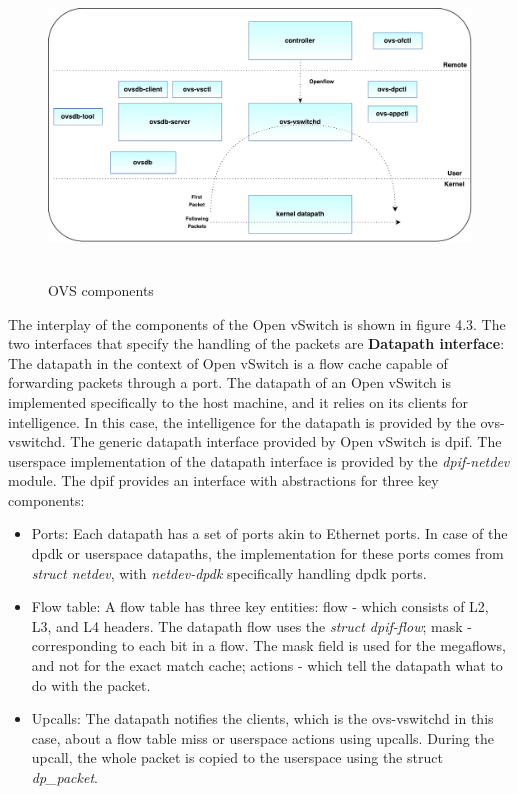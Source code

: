  \begin{figure}[H] 
  \centering   
 \caption{OVS components}
 \includegraphics[height=8cm]{kernaldatapath.pdf}
\end{figure}

The interplay of the components of the Open vSwitch is shown in figure 4.3. The two interfaces that specify the handling of the packets are \newline
\textbf{Datapath interface}: The datapath in the context of Open vSwitch is a flow cache capable of forwarding packets through a port. The datapath of an Open vSwitch is implemented specifically to the host machine, and it relies on its clients for intelligence. In this case, the intelligence for the datapath is provided by the ovs-vswitchd. The generic datapath interface provided by Open vSwitch is dpif. The userspace implementation of the datapath interface is provided by the \textit{dpif-netdev} module. The dpif provides an interface with abstractions for three key components:
\begin{itemize}
 \item Ports: Each datapath has a set of ports akin to Ethernet ports. In case of the dpdk or userspace datapaths, the implementation for these ports comes from \textit{struct netdev}, with \textit{netdev-dpdk} specifically handling dpdk ports.
 \item Flow table: A flow table has three key entities: flow - which consists of L2, L3, and L4 headers. The datapath flow uses the \textit{struct dpif-flow}; mask - corresponding to each bit in a flow. The mask field is used for the megaflows, and not for the exact match cache; actions - which tell the datapath what to do with the packet.
 \item Upcalls: The datapath notifies the clients, which is the ovs-vswitchd in this case, about a flow table miss or userspace actions using upcalls. During the upcall, the whole packet is copied to the userspace using the struct \textit{dp_packet}.
\end{itemize}

